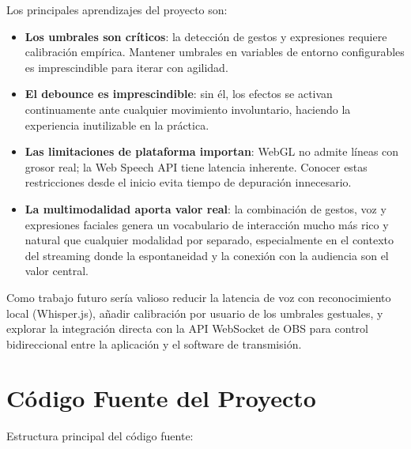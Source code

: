 \documentclass[11pt]{article}
\begin{document}
Los principales aprendizajes del proyecto son:
\begin{itemize}
    \item \textbf{Los umbrales son críticos}: la detección de gestos y expresiones requiere calibración empírica. Mantener umbrales en variables de entorno configurables es imprescindible para iterar con agilidad.
    \item \textbf{El debounce es imprescindible}: sin él, los efectos se activan continuamente ante cualquier movimiento involuntario, haciendo la experiencia inutilizable en la práctica.
    \item \textbf{Las limitaciones de plataforma importan}: WebGL no admite líneas con grosor real; la Web Speech API tiene latencia inherente. Conocer estas restricciones desde el inicio evita tiempo de depuración innecesario.
    \item \textbf{La multimodalidad aporta valor real}: la combinación de gestos, voz y expresiones faciales genera un vocabulario de interacción mucho más rico y natural que cualquier modalidad por separado, especialmente en el contexto del streaming donde la espontaneidad y la conexión con la audiencia son el valor central.
\end{itemize}

Como trabajo futuro sería valioso reducir la latencia de voz con reconocimiento local (Whisper.js), añadir calibración por usuario de los umbrales gestuales, y explorar la integración directa con la API WebSocket de OBS para control bidireccional entre la aplicación y el software de transmisión.

\newpage



\newpage
\appendix

\section{Código Fuente del Proyecto}
\label{sec:codigoFuente}

Estructura principal del código fuente:
\end{document}
